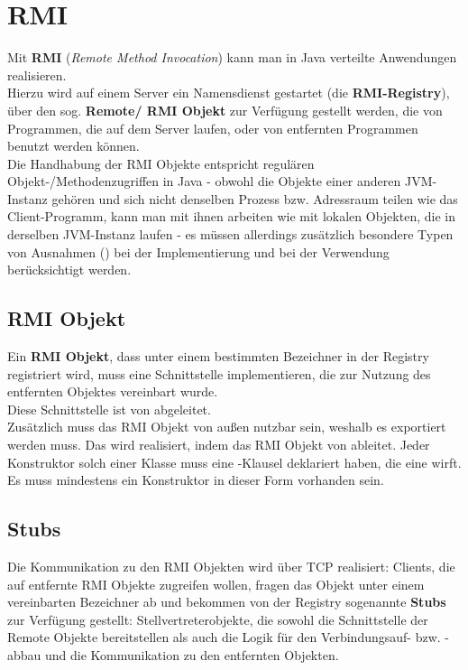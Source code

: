 \section{RMI}

Mit \textbf{RMI} (\textit{Remote Method Invocation}) kann man in Java verteilte Anwendungen realisieren.\\
Hierzu wird auf einem Server ein Namensdienst gestartet (die \textbf{RMI-Registry}), über den sog. \textbf{Remote/ RMI Objekt} zur Verfügung gestellt werden, die von Programmen, die auf dem Server laufen, oder von entfernten Programmen benutzt werden können.\\
Die Handhabung der RMI Objekte entspricht regulären Objekt-/Methodenzugriffen in Java - obwohl die Objekte einer anderen JVM-Instanz gehören und sich nicht denselben Prozess {bzw.} Adressraum teilen wie das Client-Programm, kann man mit ihnen arbeiten wie mit lokalen Objekten, die in derselben JVM-Instanz laufen - es müssen allerdings zusätzlich besondere Typen von Ausnahmen () bei der Implementierung und bei der Verwendung berücksichtigt werden.\\

\subsection*{RMI Objekt}
Ein \textbf{RMI Objekt}, dass unter einem bestimmten Bezeichner in der Registry registriert wird, muss eine Schnittstelle implementieren, die zur Nutzung des entfernten Objektes vereinbart wurde.\\
Diese Schnittstelle ist von  abgeleitet.\\
Zusätzlich muss das RMI Objekt von außen nutzbar sein, weshalb es exportiert werden muss.
Das wird realisiert, indem das RMI Objekt von  ableitet.
Jeder Konstruktor solch einer Klasse muss eine -Klausel deklariert haben, die eine  wirft.\\
Es muss mindestens ein Konstruktor in dieser Form vorhanden sein.

\subsection*{Stubs}
Die Kommunikation zu den RMI Objekten wird über TCP realisiert: Clients, die auf entfernte RMI Objekte zugreifen wollen, fragen das Objekt unter einem vereinbarten Bezeichner ab und bekommen von der Registry sogenannte \textbf{Stubs} zur Verfügung gestellt: Stellvertreterobjekte, die sowohl die Schnittstelle der Remote Objekte bereitstellen als auch die Logik für den Verbindungsauf- bzw. -abbau und die Kommunikation zu den entfernten Objekten.\\

